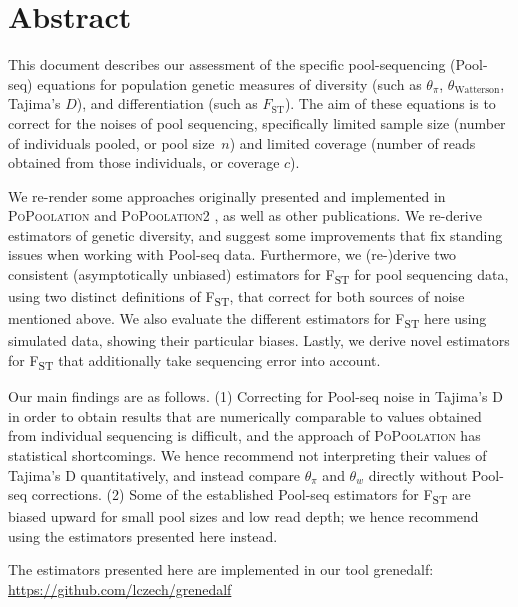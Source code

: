 \documentclass[letterpaper,fontsize=9pt,DIV=12]{scrartcl}
\newcommand\toolname{\textsc}
\newcommand{\samplesize}{n}
\newcommand{\coverage}{c}
\newcommand{\fst}{F\textsubscript{ST}}
\newcommand{\mathfst}{F_\text{ST}}
\begin{document}
\section*{Abstract}
\label{supp:sec:Abstract}

This document describes our assessment of the specific pool-sequencing (Pool-seq) equations for population genetic measures of diversity (such as $\theta_\pi$, $\theta_\text{Watterson}$, Tajima's $D$), and differentiation (such as $\mathfst$).
The aim of these equations is to correct for the noises of pool sequencing, specifically limited sample size (number of individuals pooled, or pool size~$\samplesize$) and limited coverage (number of reads obtained from those individuals, or coverage $\coverage$).

We re-render some approaches originally presented and implemented in \toolname{PoPoolation} \cite{Kofler2011a} and \toolname{PoPoolation2} \cite{Kofler2011b}, as well as other publications.  We re-derive estimators of genetic diversity, and suggest some improvements that fix standing issues when working with Pool-seq data. Furthermore, we (re-)derive two consistent (asymptotically unbiased) estimators for \fst{} for pool sequencing data, using two distinct definitions of \fst{}, that correct for both sources of noise mentioned above.  We also evaluate the different estimators for \fst{} here using simulated data, showing their particular biases.  Lastly, we derive novel estimators for \fst{} that additionally take sequencing error into account.  

Our main findings are as follows. (1) Correcting for Pool-seq noise in Tajima's D in order to obtain results that are numerically comparable to values obtained from individual sequencing is difficult, and the approach of \toolname{PoPoolation} has statistical shortcomings. We hence recommend not interpreting their values of Tajima's D quantitatively, and instead compare $\theta_{\pi}$ and $\theta_{w}$ directly without Pool-seq corrections. (2) Some of the established Pool-seq estimators for \fst{} are biased upward for small pool sizes and low read depth; we hence recommend using the estimators presented here instead.

The estimators presented here are implemented in our tool 
grenedalf: \url{https://github.com/lczech/grenedalf}


\end{document}
